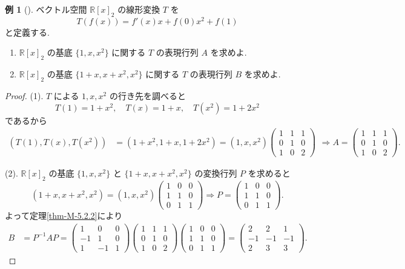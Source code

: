 \documentclass[dvipdfmx,a4paper,11pt]{article} %
\theoremstyle{definition}
\newtheorem{eg}[thm]{例}
\begin{document}
\begin{eg}
[{\cite[例題5.2.3]{M}}]
ベクトル空間 $\mathbb{R}[x]_2$ の線形変換 $T$ を
\[
T(f(x))=f'(x)x+f(0)x^2+f(1)
\]
と定義する.
\begin{enumerate}
\item[(1)] $\mathbb{R}[x]_2$ の基底 $\{1,x,x^2\}$ に関する $T$ の表現行列 $A$ を求めよ.
\item[(2)] $\mathbb{R}[x]_2$ の基底 $\{1+x,x+x^2,x^2\}$ に関する $T$ の表現行列 $B$ を求めよ.
\end{enumerate}
\end{eg}
\begin{proof}

(1). $T$ による $1,x,x^2$ の行き先を調べると
\[
T(1)=1+x^2,
\quad
T(x)=1+x,
\quad
T(x^2)=1+2x^2
\]
であるから
\[
\begin{aligned}
(T(1),T(x),T(x^2))
&=(1+x^2,1+x,1+2x^2)
=(1,x,x^2)
\begin{pmatrix}
1&1&1\\
0&1&0\\
1&0&2
\end{pmatrix}
\end{aligned}
\Rightarrow
A=
\begin{pmatrix}
1&1&1\\
0&1&0\\
1&0&2
\end{pmatrix}.
\]

(2). $\mathbb{R}[x]_2$ の基底 $\{1,x,x^2\}$ と $\{1+x,x+x^2,x^2\}$ の変換行列 $P$ を求めると
\[
(1+x,x+x^2,x^2)
=
(1,x,x^2)
\begin{pmatrix}
1&0&0\\
1&1&0\\
0&1&1
\end{pmatrix}
\Rightarrow
P=
\begin{pmatrix}
1&0&0\\
1&1&0\\
0&1&1
\end{pmatrix}.
\]
よって定理\ref{thm-M-5.2.2}により
\[
\begin{aligned}
B
&=P^{-1}AP
=
\begin{pmatrix}
1&0&0\\
-1&1&0\\
1&-1&1
\end{pmatrix}
\begin{pmatrix}
1&1&1\\
0&1&0\\
1&0&2
\end{pmatrix}
\begin{pmatrix}
1&0&0\\
1&1&0\\
0&1&1
\end{pmatrix}=
\begin{pmatrix}
2&2&1\\
-1&-1&-1\\
2&3&3
\end{pmatrix}.
\end{aligned}
\]
\end{proof}
\end{document}
